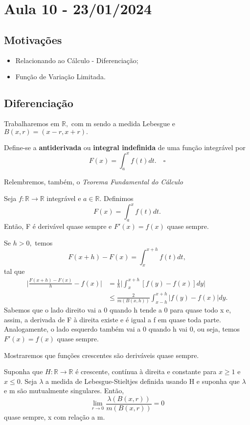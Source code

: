 \documentclass[MeasureTheory/measure_theory.tex]{subfiles}
\begin{document}
\section{Aula 10 - 23/01/2024}
\subsection{Motivações}
\begin{itemize}
	\item Relacionando ao Cálculo - Diferenciação;
	\item Função de Variação Limitada.
\end{itemize}
\subsection{Diferenciação}
Trabalharemos em \(\mathbb{R},\) com m sendo a medida Lebesgue e \(B(x, r) = (x-r, x+r).\)
\begin{def*}
	Define-se a \textbf{antiderivada} ou \textbf{integral indefinida} de uma função integrável por
	\[
		F(x) = \int_{a}^{x}f(t)dt.\quad \square
	\]
\end{def*}
Relembremos, também, o \textit{Teorema Fundamental do Cálculo}
\hypertarget{calculus}{\begin{theorem*}
		Seja \(f:\mathbb{R}\rightarrow \mathbb{R}\) integrável e \(a\in \mathbb{R}.\) Definimos
		\[
			F(x) = \int_{a}^{x}f(t)dt.
		\]
		Então, F é derivável quase sempre e \(F'(x) = f(x)\) quase sempre.
	\end{theorem*}}
\begin{proof*}
	Se \(h > 0,\) temos
	\[
		F(x+h) - F(x) = \int_{x}^{x+h}f(t)dt,
	\]
	tal que
	\begin{align*}
		\biggl\vert \frac{F(x+h) - F(x)}{h} - f(x) \biggr\vert & = \frac{1}{h}\biggl\vert \int_{x}^{x+h}[f(y) - f(x)]dy \biggr\vert \\
		                                                       & \leq \frac{2}{m(B(x, h))}\int_{x-h}^{x+h}|f(y) - f(x)|dy.
	\end{align*}
	Sabemos que o lado direito vai a 0 quando h tende a 0 para quase todo x e, assim, a derivada de F à direita existe e é igual a f em quase toda parte. Analogamente, o lado esquerdo também vai a 0 quando h vai 0, ou seja, temos
	\(F'(x) = f(x)\) quase sempre. \qedsymbol
\end{proof*}
Mostraremos que funções crescentes são deriváveis quase sempre.
\begin{lemma*}
	Suponha que \(H:\mathbb{R}\rightarrow \mathbb{R}\) é crescente, contínua à direita e constante para \(x\geq 1\) e \(x\leq 0.\) Seja \(\lambda \) a medida de Lebesgue-Stieltjes definida usando H e suponha que \(\lambda \) e m são mutualmente singulares. Então,
	\[
		\lim_{r\to 0}\frac{\lambda (B(x, r))}{m(B(x, r))} = 0
	\]
	quase sempre, x com relação a m.
\end{lemma*}
\end{document}
